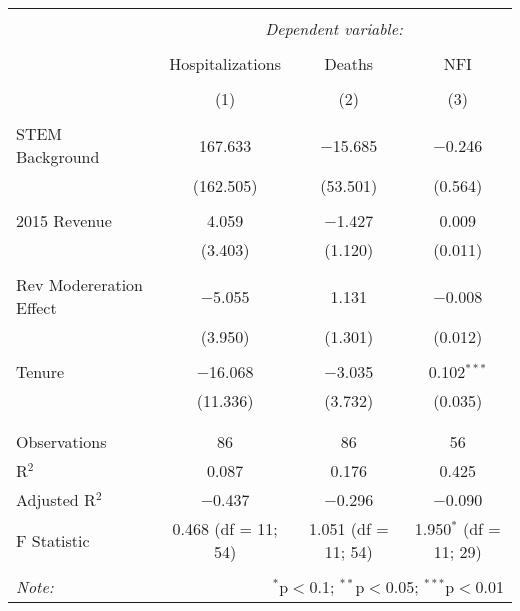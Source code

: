 
\begin{table}[!htbp] \centering 
  \caption{} 
  \label{} 
\begin{tabular}{@{\extracolsep{5pt}}lccc} 
\\[-1.8ex]\hline 
\hline \\[-1.8ex] 
 & \multicolumn{3}{c}{\textit{Dependent variable:}} \\ 
\cline{2-4} 
\\[-1.8ex] & Hospitalizations & Deaths & NFI \\ 
\\[-1.8ex] & (1) & (2) & (3)\\ 
\hline \\[-1.8ex] 
 STEM Background & 167.633 & $-$15.685 & $-$0.246 \\ 
  & (162.505) & (53.501) & (0.564) \\ 
  & & & \\ 
 2015 Revenue & 4.059 & $-$1.427 & 0.009 \\ 
  & (3.403) & (1.120) & (0.011) \\ 
  & & & \\ 
 Rev Modereration Effect & $-$5.055 & 1.131 & $-$0.008 \\ 
  & (3.950) & (1.301) & (0.012) \\ 
  & & & \\ 
 Tenure & $-$16.068 & $-$3.035 & 0.102$^{***}$ \\ 
  & (11.336) & (3.732) & (0.035) \\ 
  & & & \\ 
\hline \\[-1.8ex] 
Observations & 86 & 86 & 56 \\ 
R$^{2}$ & 0.087 & 0.176 & 0.425 \\ 
Adjusted R$^{2}$ & $-$0.437 & $-$0.296 & $-$0.090 \\ 
F Statistic & 0.468 (df = 11; 54) & 1.051 (df = 11; 54) & 1.950$^{*}$ (df = 11; 29) \\ 
\hline 
\hline \\[-1.8ex] 
\textit{Note:}  & \multicolumn{3}{r}{$^{*}$p$<$0.1; $^{**}$p$<$0.05; $^{***}$p$<$0.01} \\ 
\end{tabular} 
\end{table} 
